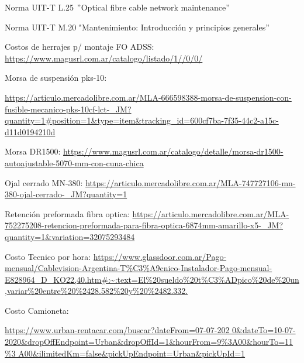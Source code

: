 \begin{thebibliography}{99}

Norma UIT-T L.25 $"$Optical fibre cable network maintenance''

Norma UIT-T M.20 "Mantenimiento: Introducción y principios generales''


Costos de herrajes p/ montaje FO ADSS: \url{https://www.magusrl.com.ar/catalogo/listado/1//0/0/}

Morsa de suspensión pks-10: \begin{tiny}
\url{https://articulo.mercadolibre.com.ar/MLA-666598388-morsa-de-suspension-con-fusible-mecanico-pks-10cf-lct-_JM?quantity=1#position=1&type=item&tracking_id=600cf7ba-7f35-44c2-a15c-d11d0194210d
}
\end{tiny}

Morsa DR1500: \url{https://www.magusrl.com.ar/catalogo/detalle/morsa-dr1500-autoajustable-5070-mm-con-cuna-chica
}

Ojal cerrado MN-380: \url{https://articulo.mercadolibre.com.ar/MLA-747727106-mn-380-ojal-cerrado-_JM?quantity=1
}

Retención preformada fibra optica: \url{https://articulo.mercadolibre.com.ar/MLA-752275208-retencion-preformada-para-fibra-optica-6874mm-amarillo-x5-_JM?quantity=1&variation=32075293484}

 Costo Tecnico por hora: 
{\tiny \url{https://www.glassdoor.com.ar/Pago-mensual/Cablevision-Argentina-T\%C3\%A9cnico-Instalador-Pago-mensual-E828964_D_KO22,40.htm#:~:text=El\%20sueldo\%20t\%C3\%ADpico\%20de\%20un,variar\%20entre\%20\%2428.582\%20y\%20\%2482.332.}}


 Costo Camioneta: 
\begin{tiny}
\url{https://www.urban-rentacar.com/buscar?dateFrom=07-07-202
0&dateTo=10-07-2020&dropOffEndpoint=Urban&dropOffId=1&hourFrom=9%
A00&ilimitedKm=false&pickUpEndpoint=Urban&pickUpId=1}
\end{tiny}








\end{thebibliography}


\newpage

